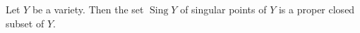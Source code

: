 Let $Y$ be a variety. Then the set $\operatorname{Sing} Y$ of singular points of $Y$ is a proper closed subset of $Y$.
